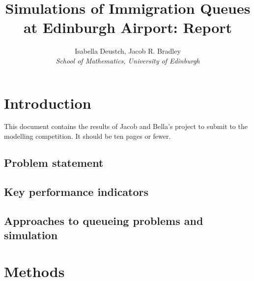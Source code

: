 \documentclass[12pt]{article}
\title{Simulations of Immigration Queues at Edinburgh Airport: Report}
\author{Isabella Deustch, Jacob R. Bradley
 \\ \emph{School of Mathematics, University of Edinburgh}}
\begin{document}
\maketitle

\section{Introduction}
This document contains the results of Jacob and Bella's project to submit to the modelling competition. It should be ten pages or fewer.




\subsection{Problem statement}
\subsection{Key performance indicators}
\subsection{Approaches to queueing problems and simulation}


\section{Methods}


\end{document}
